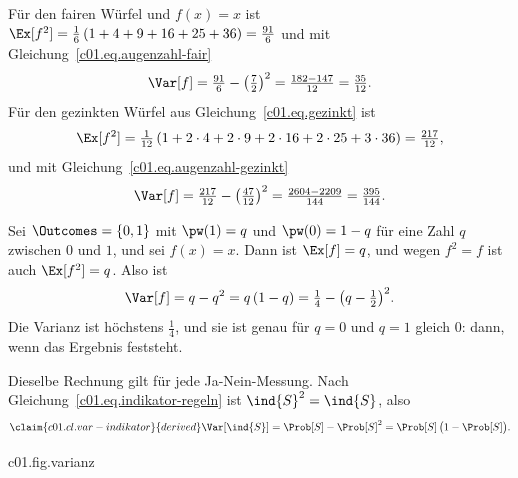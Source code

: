 \begin{example}\label{c01.ex.wuerfel-varianz}
  Für den fairen Würfel und $f(x) = x$ ist
  $\Ex[f^2] = \tfrac16\,(1 + 4 + 9 + 16 + 25 + 36) = \tfrac{91}{6}$ und mit
  Gleichung~\eqref{c01.eq.augenzahl-fair}
  \begin{equation}\label{c01.eq.varianz-fair}
    \Var[f] = \tfrac{91}{6} - \bigl(\tfrac72\bigr)^2 = \tfrac{182 - 147}{12} = \tfrac{35}{12} .
  \end{equation}
  Für den gezinkten Würfel aus Gleichung~\eqref{c01.eq.gezinkt} ist
  \begin{equation*}
    \Ex[f^2] = \tfrac{1}{12}\,(1 + 2\cdot 4 + 2\cdot 9 + 2\cdot 16 + 2\cdot 25 + 3\cdot 36)
    = \tfrac{217}{12} ,
  \end{equation*}
  und mit Gleichung~\eqref{c01.eq.augenzahl-gezinkt}
  \begin{equation}\label{c01.eq.varianz-gezinkt}
    \Var[f] = \tfrac{217}{12} - \bigl(\tfrac{47}{12}\bigr)^2
            = \tfrac{2604 - 2209}{144} = \tfrac{395}{144} .
  \end{equation}
\end{example}

\begin{example}\label{c01.ex.muenze}
  Sei $\Outcomes = \{0, 1\}$ mit $\pw(1) = q$ und $\pw(0) = 1 - q$ für eine Zahl $q$
  zwischen $0$ und $1$, und sei $f(x) = x$. Dann ist $\Ex[f] = q$, und wegen $f^2 = f$ ist
  auch $\Ex[f^2] = q$. Also ist
  \begin{equation}\label{c01.eq.zwei-ergebnisse}
    \Var[f] = q - q^2 = q\,(1 - q) = \tfrac14 - \bigl(q - \tfrac12\bigr)^2 .
  \end{equation}
  Die Varianz ist höchstens $\tfrac14$, und sie ist genau für $q = 0$ und $q = 1$ gleich
  $0$: dann, wenn das Ergebnis feststeht.
\end{example}

Dieselbe Rechnung gilt für jede Ja-Nein-Messung. Nach
Gleichung~\eqref{c01.eq.indikator-regeln} ist $\ind{S}^2 = \ind{S}$, also
\begin{equation}\label{c01.eq.var-indikator}\claim{c01.cl.var-indikator}{derived}
  \Var[\ind{S}] = \Prob[S] - \Prob[S]^2 = \Prob[S]\,\bigl(1 - \Prob[S]\bigr) .
\end{equation}

\begin{tpcfigure}{c01.fig.varianz}

  \caption{(a), (b) Zwei Gewichte mit demselben Erwartungswert $\tfrac72$ der Augenzahl
    $f(x) = x$ (gestrichelte Linie) und verschiedener Varianz: der faire Würfel aus
    Gleichung~\eqref{c01.eq.varianz-fair} und ein Gewicht, das je zur Hälfte auf $3$ und
    $4$ liegt; für dieses ist $\Ex[f^2] = \tfrac{9 + 16}{2}$ und
    $\Var[f] = \tfrac{25}{2} - \tfrac{49}{4} = \tfrac14$. (c) Die Varianz
    einer Ja-Nein-Messung als Funktion von $q = \Prob[S]$ nach
    Gleichung~\eqref{c01.eq.var-indikator}: Sie verschwindet genau an den beiden Enden, wo
    die Antwort feststeht, und ist bei $q = \tfrac12$ am größten.}
\end{tpcfigure}


